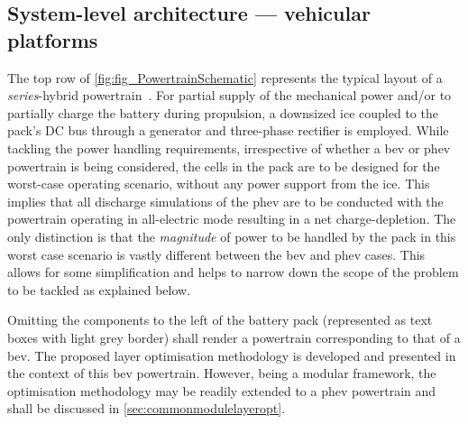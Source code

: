 \subsection{System-level architecture --- vehicular platforms}

The top row of  \cref{fig:fig_PowertrainSchematic} represents the typical layout
of a \emph{series}-hybrid powertrain~\cite{Emadi2017}. For partial supply of the
mechanical  power and/or  to  partially charge  the  battery during  propulsion,
a  downsized  \gls{ice}  coupled  to  the pack's  DC  bus  through  a  generator
and  three-phase  rectifier  is  employed. While  tackling  the  power  handling
requirements, irrespective  of whether a  \gls{bev} or \gls{phev}  powertrain is
being considered, the  cells in the pack  are to be designed  for the worst-case
operating  scenario,  \ie{}  without  any  power  support  from  the  \gls{ice}.
This  implies  that all  discharge  simulations  of  the  \gls{phev} are  to  be
conducted with the powertrain operating in  all-electric mode resulting in a net
charge-depletion. The only distinction is  that the \emph{magnitude} of power to
be handled by the  pack in this worst case scenario  is vastly different between
the  \gls{bev} and  \gls{phev} cases.  This allows  for some  simplification and
helps to narrow down the scope of the problem to be tackled as explained below.

Omitting the  components to the  left of the  battery pack (represented  as text
boxes with light grey border) shall render a powertrain corresponding to that of
a  \gls{bev}.  The proposed  layer  optimisation  methodology is  developed  and
presented in the context of this  \gls{bev} powertrain. However, being a modular
framework, the optimisation methodology may  be readily extended to a \gls{phev}
powertrain and shall be discussed in \cref{sec:commonmodulelayeropt}.


